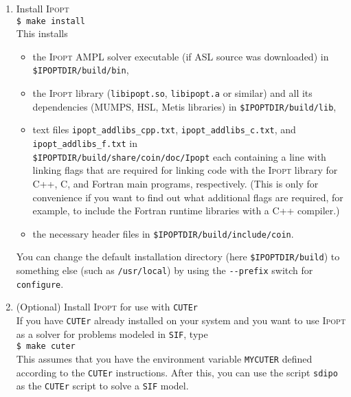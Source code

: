 \documentclass[10pt]{article}
\newcommand{\Ipopt}{\textsc{Ipopt}\xspace}
\begin{document}
\begin{enumerate}
  Note: The {\tt configure} script is not able to automatically
  determine the C++ runtime libraries for the C++ compiler.  For
  certain compilers we enabled default values for this, but those
  might not exist or be wrong for your compiler.  In that case, the C
  and Fortran example in the test will most probably fail to compile.
  If you don't want to hook up the compiled \Ipopt library to some
  Fortran or C code that you wrote you don't need to worry about this.
  If you do want to link the \Ipopt library with a C or Fortran
  compiler, you need to find out the C++ runtime libraries (e.g., by
  running the C++ compiler in verbose mode for a simple example
  program) and run {\tt configure} again, and this time specify all
  C++ runtime libraries with the {\tt CXXLIBS} variable (see also
  Appendix~\ref{ExpertInstall}).
\item Install \Ipopt \\
  {\tt \$ make install}\\
  This installs
  \begin{itemize}
  \item the \Ipopt AMPL solver executable (if ASL source was
    downloaded) in \texttt{\$IPOPTDIR/build/bin},
  \item the \Ipopt library (\texttt{libipopt.so}, \texttt{libipopt.a}
    or similar) and all its dependencies (MUMPS, HSL, Metis libraries)
    in \texttt{\$IPOPTDIR/build/lib},
  \item text files {\tt ipopt\_addlibs\_cpp.txt}, {\tt ipopt\_addlibs\_c.txt}, 
      and {\tt ipopt\_addlibs\_f.txt} in\\ 
    \texttt{\$IPOPTDIR/build/share/coin/doc/Ipopt} each 
    containing a line with linking flags that are required for
    linking code with the \Ipopt library for C++, C, and Fortran main
    programs, respectively. (This is only for convenience if you want
    to find out what additional flags are required, for example, to
    include the Fortran runtime libraries with a C++ compiler.)
  \item the necessary header files in
    \texttt{\$IPOPTDIR/build/include/coin}.
  \end{itemize}
  You can change the default installation directory (here
  \texttt{\$IPOPTDIR/build}) to something else (such as \texttt{/usr/local})
  by using the \verb|--prefix| switch for \texttt{configure}.
\item (Optional) Install \Ipopt for use with {\tt CUTEr}\\
  If you have {\tt CUTEr} already installed on your system and you
  want to use \Ipopt as a solver for problems modeled in {\tt SIF},
  type\\
  {\tt \$ make cuter}\\
  This assumes that you have the environment variable {\tt MYCUTER}
  defined according to the {\tt CUTEr} instructions.  After this, you
  can use the script {\tt sdipo} as the {\tt CUTEr} script to solve a
  {\tt SIF} model.
\end{enumerate}
\end{document}
